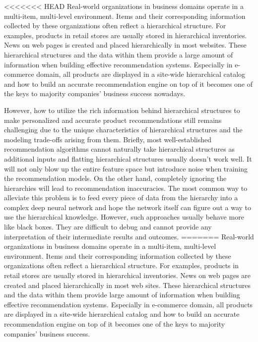 <<<<<<< HEAD
Real-world organizations in business domains operate in a multi-item, multi-level environment. Items and their corresponding information collected by these organizations often reflect a hierarchical structure. For examples, products in retail stores are usually stored in hierarchical inventories. News on web pages is created and placed hierarchically in most websites. These hierarchical structures and the data within them provide a large amount of information when building effective recommendation systems. Especially in e-commerce domain, all products are displayed in a site-wide hierarchical catalog and how to build an accurate recommendation engine on top of it becomes one of the keys to majority companies' business success nowadays. 

However, how to utilize the rich information behind hierarchical structures to make personalized and accurate product recommendations still remains challenging due to the unique characteristics of hierarchical structures and the modeling trade-offs arising from them. Briefly, most well-established recommendation algorithms cannot naturally take hierarchical structures as additional inputs and flatting hierarchical structures usually doesn't work well. It will not only blow up the entire feature space but introduce noise when training the recommendation models. On the other hand, completely ignoring the hierarchies will lead to recommendation inaccuracies. The most common way to alleviate this problem is to feed every piece of data from the hierarchy into a complex deep neural network and hope the network itself can figure out a way to use the hierarchical knowledge. However, such approaches usually behave more like black boxes. They are difficult to debug and cannot provide any interpretation of their intermediate results and outcomes.
=======
Real-world organizations in business domains operate in a multi-item, multi-level environment. Items and their corresponding information collected by these organizations often reflect a hierarchical structure. For examples, products in retail stores are usually stored in hierarchical inventories. News on web pages are created and placed hierarchically in most web sites. These hierarchical structures and the data within them provide large amount of information when building effective recommendation systems. Especially in e-commerce domain, all products are displayed in a site-wide hierarchical catalog and how to build an accurate recommendation engine on top of it becomes one of the keys to majority companies' business success. 

